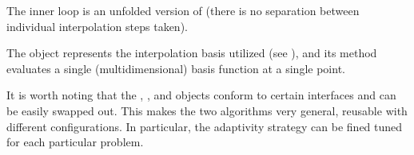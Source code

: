 \begin{compactlist}

 The inner loop is an unfolded version of 
(there is no separation between individual interpolation steps taken).

 The  object represents the interpolation basis
utilized (see ), and its  method evaluates
a single (multidimensional) basis function at a single point.

\end{compactlist}

It is worth noting that the , , and 
objects conform to certain interfaces and can be easily swapped out. This makes
the two algorithms very general, reusable with different configurations. In
particular, the adaptivity strategy can be fined tuned for each particular
problem.
